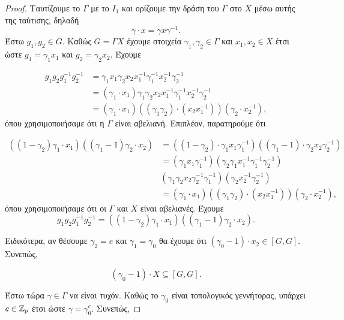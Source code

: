 \begin{proof}
    Ταυτίζουμε το $\Gamma$ με το $I_1$ και ορίζουμε την δράση του $\Gamma$ στο $X$ μέσω αυτής της ταύτισης, δηλαδή
    $$\gamma \cdot x = \gamma x \gamma^{-1}.$$
    Έστω $g_1,g_2 \in G$. Καθώς $G=\Gamma X$ έχουμε στοιχεία $\gamma_1,\gamma_2 \in \Gamma$ και $x_1,x_2 \in X$ έτσι ώστε $g_1 = \gamma_1 x_1$ και $g_2 = \gamma_2 x_2$. Έχουμε 

    \begin{align*}
        g_1 g_2 g_1^{-1} g_2^{-1} & = \gamma_1 x_1 \gamma_2 x_2 x_1^{-1} \gamma_1^{-1} x_2^{-1} \gamma_2^{-1} \\ 
        & = \left( \gamma_1 \cdot x_1\right) \gamma_1 \gamma_2 x_2 x_1^{-1} \gamma_1^{-1} x_2^{-1} \gamma_2^{-1} \\
        &= \left( \gamma_1 \cdot x_1 \right) \left( (\gamma_1 \gamma_2) \cdot (x_2 x_1^{-1})\right) \left(\gamma_2 \cdot x_2^{-1}\right),
    \end{align*} όπου χρησιμοποιήσαμε ότι η $\Gamma$ είναι αβελιανή. Επιπλέον, παρατηρούμε ότι

    \begin{align*}
        \left( (1-\gamma_2)\gamma_1 \cdot x_1\right) \left((\gamma_1 - 1) \gamma_2 \cdot x_2\right) &= \left((1-\gamma_2) \cdot \gamma_1 x_1 \gamma_1^{-1}\right) \left( (\gamma_1 - 1) \cdot \gamma_2 x_2 \gamma_2^{-1}\right) \\
        &= \left( \gamma_1 x_1 \gamma_1^{-1}\right) \left(\gamma_2\gamma_1x_1^{-1}\gamma_1^{-1}\gamma_2^{-1}\right) \\ 
        & \left(\gamma_1\gamma_2 x_2 \gamma_2^{-1} \gamma_1^{-1}\right) \left(\gamma_2x_2^{-1}\gamma_2^{-1}\right) \\
        &= \left( \gamma_1 \cdot x_1 \right) \left( (\gamma_1 \gamma_2) \cdot (x_2 x_1^{-1})\right) \left(\gamma_2 \cdot x_2^{-1}\right),
    \end{align*} όπου χρησιμοποιήσαμε ότι οι $\Gamma$ και $X$ είναι αβελιανές. Έχουμε
    $$g_1g_2 g_1^{-1} g_2^{-1} = \left((1-\gamma_2) \gamma_1 \cdot x_1\right) \left((\gamma_1 -1)\gamma_2 \cdot x_2\right).$$

    \noindent Ειδικότερα, αν θέσουμε $\gamma_2 = e$ και $\gamma_1 = \gamma_0$ θα έχουμε ότι $(\gamma_0 - 1) \cdot x_2 \in [G,G]$. Συνεπώς,

    $$(\gamma_0 -1) \cdot X \subseteq [G,G].$$

    \noindent Έστω τώρα $\gamma \in \Gamma$ να είναι τυχόν. Καθώς το $\gamma_0$ είναι τοπολογικός γεννήτορας, υπάρχει $c \in \mathbb{Z}_p$ έτσι ώστε $\gamma = \gamma_0^c$. Συνεπώς,


\end{proof}
